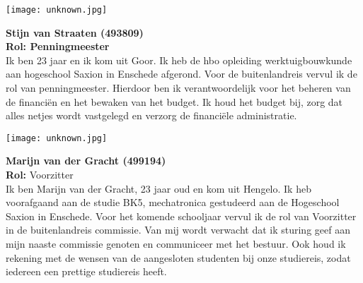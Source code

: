 \vspace{1cm}
\newpage

\begin{minipage}{0.5\linewidth}
	\texttt{[image: unknown.jpg]}
\end{minipage}
\hfill
\vspace{1cm}
\begin{minipage}{\linewidth}
	\textbf{Stijn van Straaten (493809)} \\
	\textbf{Rol: Penningmeester}  \\
	Ik ben 23 jaar en ik kom uit Goor. Ik heb de hbo opleiding werktuigbouwkunde aan hogeschool Saxion in Enschede afgerond. Voor de buitenlandreis vervul ik de rol van penningmeester. Hierdoor ben ik verantwoordelijk voor het beheren van de financiën en het bewaken van het budget. Ik houd het budget bij, zorg dat alles netjes wordt vastgelegd en verzorg de financiële administratie.
\end{minipage}

\vspace{1cm}

\begin{minipage}{0.5\linewidth}
	\texttt{[image: unknown.jpg]}
\end{minipage}
\hfill
\vspace{1cm}
\begin{minipage}{\linewidth}
	\textbf{Marijn van der Gracht (499194)} \\
	\textbf{Rol:} Voorzitter \\
	Ik ben Marijn van der Gracht, 23 jaar oud en kom uit Hengelo. Ik heb voorafgaand aan de studie BK5, mechatronica gestudeerd aan de Hogeschool Saxion in Enschede. Voor het komende schooljaar vervul ik de rol van Voorzitter in de buitenlandreis commissie. Van mij wordt verwacht dat ik sturing geef aan mijn naaste commissie genoten en communiceer met het bestuur. Ook houd ik rekening met de wensen van de aangesloten studenten bij onze studiereis, zodat iedereen een prettige studiereis heeft. 
\end{minipage}